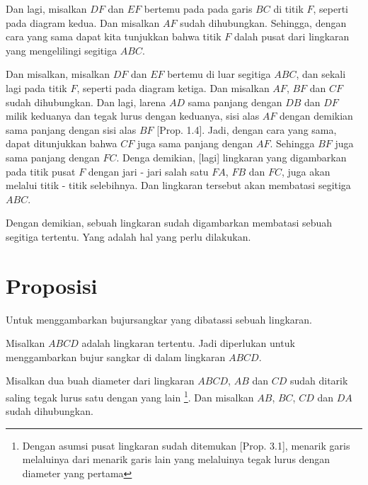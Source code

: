 \documentclass[a4paper]{book}
\begin{document}
Dan lagi, misalkan $DF$ dan $EF$ bertemu pada pada garis $BC$ di titik $F$, 
seperti pada diagram kedua. Dan misalkan $AF$ sudah dihubungkan. Sehingga, 
dengan cara yang sama dapat kita tunjukkan bahwa titik $F$ dalah pusat dari
lingkaran yang mengelilingi segitiga $ABC$.

Dan misalkan, misalkan $DF$ dan $EF$ bertemu di luar segitiga $ABC$, dan sekali
lagi pada titik $F$, seperti pada diagram ketiga. Dan misalkan $AF$, $BF$ dan 
$CF$ sudah dihubungkan. Dan lagi, larena $AD$ sama panjang dengan $DB$ dan $DF$
milik keduanya dan tegak lurus dengan keduanya, sisi alas $AF$ dengan demikian
sama panjang dengan sisi alas $BF$ [Prop. 1.4]. Jadi, dengan cara yang sama, 
dapat ditunjukkan bahwa $CF$ juga sama panjang dengan $AF$. Sehingga $BF$ juga
sama panjang dengan $FC$. Denga demikian, [lagi] lingkaran yang digambarkan pada
titik pusat $F$ dengan jari - jari salah satu $FA$, $FB$ dan $FC$, juga akan
melalui titik - titik selebihnya. Dan lingkaran tersebut akan membatasi segitiga
$ABC$.

Dengan demikian, sebuah lingkaran sudah digambarkan membatasi sebuah segitiga 
tertentu. Yang adalah hal yang perlu dilakukan.  

\section*{\centering Proposisi \thesection}
Untuk menggambarkan bujursangkar yang dibatassi sebuah lingkaran.

\begin{center} 
\end{center} 

Misalkan $ABCD$ adalah lingkaran tertentu. Jadi diperlukan untuk 
menggambarkan bujur sangkar di dalam lingkaran $ABCD$.  

Misalkan dua buah diameter dari lingkaran $ABCD$, $AB$ dan $CD$ sudah 
ditarik saling tegak lurus satu dengan yang lain \footnote{Dengan asumsi
pusat lingkaran sudah ditemukan [Prop. 3.1], menarik garis melaluinya
dari menarik garis lain yang melaluinya tegak lurus dengan diameter yang
pertama}. Dan misalkan $AB$, $BC$, $CD$ dan $DA$ sudah dihubungkan.
\end{document}
